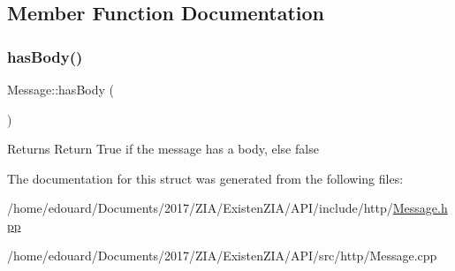 \subsection{Member Function Documentation}
\mbox{\label{structxzia_1_1Message_a096560e32a7b9dd61421770fc0199402}} 
\subsubsection{\texorpdfstring{has\+Body()}{hasBody()}}
{\footnotesize\ttfamily Message\+::has\+Body (\begin{DoxyParamCaption}{ }\end{DoxyParamCaption})}

\begin{DoxyReturn}{Returns}
Return True if the message has a body, else false 
\end{DoxyReturn}


The documentation for this struct was generated from the following files\+:\begin{DoxyCompactItemize}
\item 
/home/edouard/\+Documents/2017/\+Z\+I\+A/\+Existen\+Z\+I\+A/\+A\+P\+I/include/http/\mbox{\hyperlink{Message_8hpp}{Message.\+hpp}}\item 
/home/edouard/\+Documents/2017/\+Z\+I\+A/\+Existen\+Z\+I\+A/\+A\+P\+I/src/http/Message.\+cpp\end{DoxyCompactItemize}
